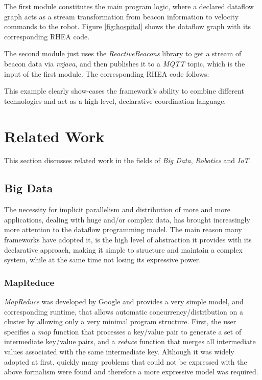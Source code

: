 \documentclass[sigplan,review,anonymous]{acmart}
\begin{document}
The first module constitutes the main program logic, where a declared dataflow
graph acts as a stream transformation from beacon information to velocity
commands to the robot. Figure \ref{fig:hospital} shows the dataflow graph with
its corresponding \textsc{RHEA} code.


The second module just uses the \textit{ReactiveBeacons}
library to get a stream of
beacon data via \textit{rxjava}, and then publishes it to a \textit{MQTT} topic,
which is the input of the first module. The corresponding \textsc{RHEA} code
follows:

This example clearly show-cases the framework's ability to combine different
technologies and act as a high-level, declarative coordination language.

\section{Related Work} \label{sec:related}

This section discusses related work in the fields of \textit{Big Data},
\textit{Robotics} and \textit{IoT}.

\subsection{Big Data}

The necessity for implicit parallelism and distribution of more and more
applications, dealing with huge and/or complex data, has brought increasingly
more attention to the dataflow programming model. The main reason many
frameworks have adopted it, is the high level of abstraction it provides with
its declarative approach, making it simple to structure and maintain a complex
system, while at the same time not losing its expressive power.

\subsubsection{MapReduce}

\textit{MapReduce} was developed by Google and provides a very simple model, and
corresponding runtime, that allows automatic concurrency/distribution on a
cluster by allowing only a very minimal program structure. First, the user
specifies a \textit{map} function that processes a key/value pair to generate a
set of intermediate key/value pairs, and a \textit{reduce} function that merges
all intermediate values associated with the same intermediate key. Although it
was widely adopted at first, quickly many problems that could not be expressed
with the above formalism were found and therefore a more expressive model was
required.
\end{document}

